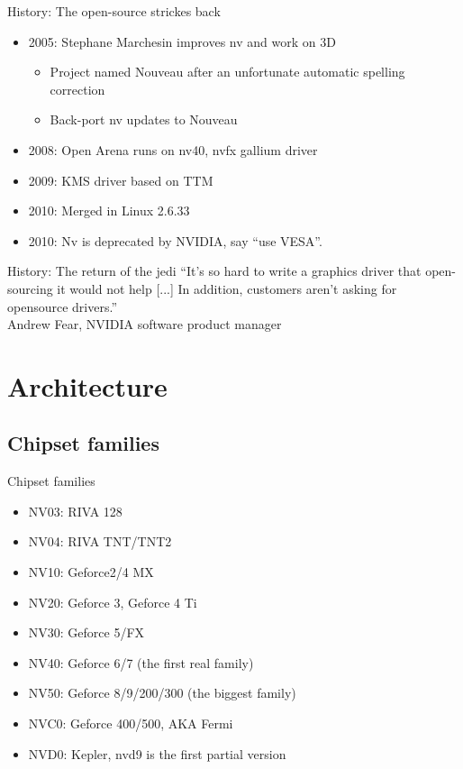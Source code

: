 \documentclass[11pt,english,compress]{beamer}
\begin{document}
	\begin{frame}
		\begin{block}{History: The open-source strickes back}
			\begin{itemize}
				\item 2005: Stephane Marchesin improves nv and work on 3D
				\begin{itemize}
					\item Project named Nouveau after an unfortunate automatic spelling correction
					\item Back-port nv updates to Nouveau
				\end{itemize}
				\item 2008: Open Arena runs on nv40, nvfx gallium driver
				\item 2009: KMS driver based on TTM
				\item 2010: Merged in Linux 2.6.33
				\item 2010: Nv is deprecated by NVIDIA, say ``use VESA''.
			\end{itemize}
		\end{block}
	\end{frame}

	\begin{frame}
		\begin{block}{History: The return of the jedi}
			``It's so hard to write a graphics driver that open-sourcing it
			would not help [...] In addition, customers aren't asking for opensource drivers.''\\
			Andrew Fear, NVIDIA software product manager
		\end{block}
	\end{frame}

\section{Architecture}
	\subsection{Chipset families}
		\begin{frame}
			\begin{block}{Chipset families}
				\begin{itemize}
					\item NV03: RIVA 128
					\item NV04: RIVA TNT/TNT2
					\item NV10: Geforce2/4 MX
					\item NV20: Geforce 3, Geforce 4 Ti
					\item NV30: Geforce 5/FX
					\item NV40: Geforce 6/7 (the first real family) 
					\item NV50: Geforce 8/9/200/300 (the biggest family)
					\item NVC0: Geforce 400/500, AKA Fermi
					\item NVD0: Kepler, nvd9 is the first partial version
				\end{itemize}
			\end{block}
		\end{frame}
\end{document}
